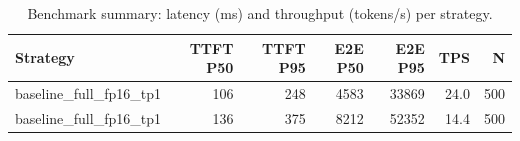 \begin{table}
\caption{Benchmark summary: latency (ms) and throughput (tokens/s) per strategy.}
\label{tab:summary}
\begin{tabular}{lrrrrrr}
\toprule
Strategy & TTFT P50 & TTFT P95 & E2E P50 & E2E P95 & TPS & N \\
\midrule
baseline_full_fp16_tp1 & 106 & 248 & 4583 & 33869 & 24.0 & 500 \\
baseline_full_fp16_tp1 & 136 & 375 & 8212 & 52352 & 14.4 & 500 \\
\bottomrule
\end{tabular}
\end{table}
